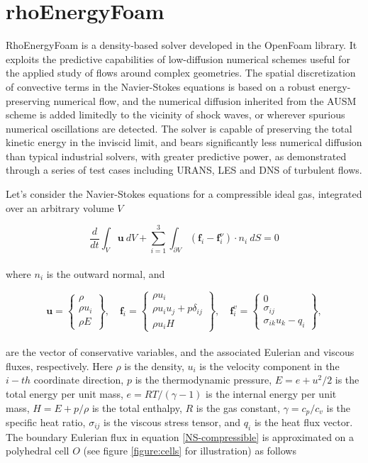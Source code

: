 \documentclass[a5paper]{sapthesis}
\begin{document}
	\section{rhoEnergyFoam}
	RhoEnergyFoam is a density-based solver developed in the OpenFoam library. It exploits the predictive capabilities of low-diffusion numerical schemes useful for the applied study of flows around complex geometries. The spatial discretization of convective terms in the Navier-Stokes equations is based on a robust energy-preserving numerical flow, and the numerical diffusion inherited from the AUSM scheme is added limitedly to the vicinity of shock waves, or wherever spurious numerical oscillations are detected. The solver is capable of preserving the total kinetic energy in the inviscid limit, and bears significantly less numerical diffusion than typical industrial solvers, with greater predictive power, as demonstrated through a series of test cases including URANS, LES and DNS of turbulent flows.  
	
	\noindent Let's consider the Navier-Stokes equations for a compressible ideal gas, integrated over an arbitrary volume $V$
	
	\begin{equation}
		\dfrac{d}{dt}\int_V \textbf{u} \ dV + \sum_{i=1}^{3} \int_{\partial{V}} (\textbf{f}_i-\textbf{f}_i^{\nu}) \cdot n_i \ dS = 0
		\label{NS-compressible}
	\end{equation}
	\\
	where  $n_i$ is the outward normal, and
	
	\begin{equation}
	\mathbf{u} =
	\begin{Bmatrix} 
		\rho \\ 
		\rho u_i \\ 
		\rho E 
	\end{Bmatrix}, \quad
	\mathbf{f}_i =
	\begin{Bmatrix} 
		\rho u_i \\ 
		\rho u_i u_j + p \delta_{ij} \\ 
		\rho u_i H 
	\end{Bmatrix}, \quad
	\mathbf{f}_i^v =
	\begin{Bmatrix} 
		0 \\ 
		\sigma_{ij} \\ 
		\sigma_{ik} u_k - q_i 
	\end{Bmatrix},
	\label{variables}
	\end{equation}
	\\
	are the vector of conservative variables, and the associated Eulerian and viscous fluxes, respectively. Here $\rho$ is the density, $ u_i$ is the velocity component in the $i-th$ coordinate direction, $p$ is the thermodynamic pressure, $ E = e + u^2/2 $ is the total energy per unit mass, $ e = RT/(\gamma - 1) $ is the internal energy per unit mass, $ H = E + p/\rho $ is the total enthalpy, $ R $ is the gas constant, $ \gamma = c_p/c_v $ is the specific heat ratio, $ \sigma_{ij} $ is the viscous stress tensor, and $ q_i $ is the heat flux vector.
	\\
	The boundary Eulerian flux in equation \ref{NS-compressible} is approximated on a polyhedral cell $ O $ (see figure \ref{figure:cells} for illustration) as follows
	
\end{document}
